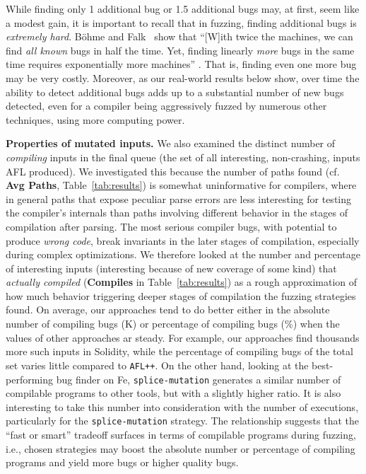 While finding only 1 additional bug or 1.5 additional bugs may, at
first, seem like a modest gain, it is important to recall that in
fuzzing, finding additional bugs is \emph{extremely hard}.  B\"{o}hme
and Falk~\cite{fuzzexp} show that ``[W]ith twice the machines, we can
find \emph{all known} bugs in half the time. Yet, finding linearly
\emph{more} bugs in the same time requires exponentially more
machines'' \cite{fuzzexp}.  That is, finding even one more bug may be
very costly.  Moreover, as our real-world results below show, over
time the ability to detect additional bugs adds up to a substantial
number of new bugs detected, even for a compiler being aggressively
fuzzed by numerous other techniques, using more computing power.

\textbf{Properties of mutated inputs.} We also examined the distinct number of
\emph{compiling} inputs in the final queue (the set of all interesting,
non-crashing, inputs AFL produced).  We investigated this because the number of
paths found (cf. \textbf{Avg Paths}, Table~\ref{tab:results}) is somewhat
uninformative for compilers, where in general paths that expose peculiar parse
errors are less interesting for testing the compiler's internals than paths
involving different behavior in the stages of compilation after parsing.  The
most serious compiler bugs, with potential to produce \emph{wrong code}, break
invariants in the later stages of compilation, especially during complex
optimizations.  We therefore looked at the number and percentage of interesting
inputs (interesting because of new coverage of some kind) that \emph{actually
compiled} (\textbf{Compiles} in Table~\ref{tab:results}) as a rough
approximation of how much behavior triggering deeper stages of compilation the
fuzzing strategies found. On average, our approaches tend to do better either
in the absolute number of compiling bugs (K) or percentage of compiling bugs
(\%) when the values of other approaches ar steady. For example, our approaches
find thousands more such inputs in Solidity, while the percentage of compiling
bugs of the total set varies little compared to \texttt{AFL++}. On the other hand,
looking at the best-performing bug finder on Fe, \texttt{splice-mutation}
generates a similar number of compilable programs to other tools, but with a slightly
higher ratio. It is also interesting to take this number into consideration
with the number of executions, particularly for the \texttt{splice-mutation}
strategy. The relationship suggests that the ``fast or smart'' tradeoff surfaces in terms of
compilable programs during fuzzing, i.e., chosen strategies may boost the
absolute number or percentage of compiling programs and yield more
bugs or higher quality bugs.

